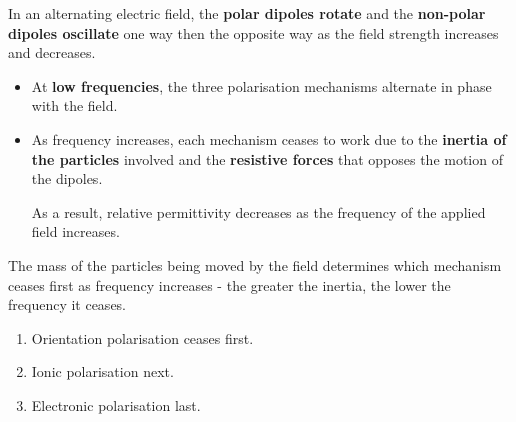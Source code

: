 In an alternating electric field, the \textbf{polar dipoles rotate} and the \textbf{non-polar dipoles oscillate} one way then the opposite way as the field strength increases and decreases.
\begin{itemize}
    \item At \textbf{low frequencies}, the three polarisation mechanisms alternate in phase with the field.
    \item As frequency increases, each mechanism ceases to work due to the \textbf{inertia of the particles} involved and the \textbf{resistive forces} that opposes the motion of the dipoles.

        As a result, relative permittivity decreases as the frequency of the applied field increases.
\end{itemize}

The mass of the particles being moved by the field determines which mechanism ceases first as frequency increases - the greater the inertia, the lower the frequency it ceases.
\begin{enumerate}
    \item Orientation polarisation ceases first.
    \item Ionic polarisation next.
    \item Electronic polarisation last.
\end{enumerate}

